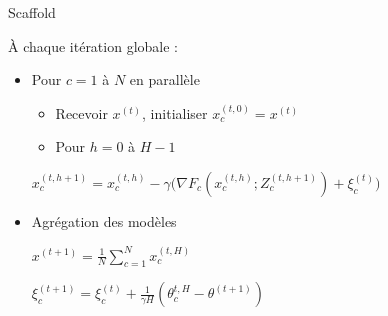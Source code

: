 \documentclass[aspectratio=169,12pt]{beamer}
\begin{document}
\begin{frame}[t]{Scaffold ~~~  ~~}  
    
    \vspace{-1em}

  \begin{minipage}{0.5\linewidth}

  \footnotesize
  À chaque itération globale :

    \begin{itemize}[leftmargin=*,itemsep=0em]
  \footnotesize
    \item Pour $c=1$ à $N$ en parallèle

\vspace{-0.2em}
    
    
\begin{itemize}[leftmargin=*,itemsep=0em]
\item Recevoir $x^{(t)}$, initialiser $x^{(t,0)}_c = x^{(t)}$
    
        \item Pour $h=0$ à $H-1$
    \end{itemize}

\vspace{-0.6em}
\begin{center}
            \hspace{-1em}$x^{(t,h+1)}_c = x^{(t,h)}_c - \gamma \big( \nabla F_c( x^{(t,h)}_c ; Z_c^{(t,h+1)}) + \xi_c^{(t)} \big)$
        \end{center}
      
  \item Agrégation des modèles
        
        
\vspace{-0.6em}
\begin{center}
            \hspace{-1em}$x^{(t+1)} = \frac{1}{N} \sum_{c=1}^N x_c^{(t,H)}$
          \end{center}
\begin{center}
            \hspace{-1em}$\xi_c^{(t+1)} = \xi_c^{(t)} + \frac{1}{\gamma H} (\theta_c^{t,H} - \theta^{(t+1)} )$
          \end{center}

          
      
    \end{itemize}
      

\end{minipage}
\end{frame}
\end{document}
